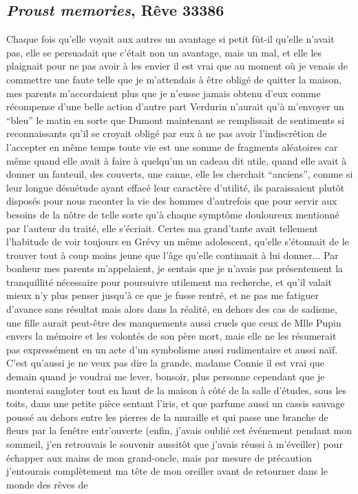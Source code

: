\documentclass{article}
\begin{document}
\begin{algorithm}
\begin{algorithmic}[1]
					\State
					\EndProcedure
				\end{algorithmic}
			\end{algorithm}
			\newpage
			
		\subsection{\textit{Proust memories}, Rêve 33386}\label{proust_memories_texte}
			Chaque fois qu'elle voyait aux autres un avantage si petit fût-il qu'elle n'avait pas, elle se persuadait que c'était non un avantage, mais un mal, et elle les plaignait pour ne pas avoir à les envier il est vrai que au moment où je venais de commettre une faute telle que je m'attendais à être obligé de quitter la maison, mes parents m'accordaient plus que je n'eusse jamais obtenu d'eux comme récompense d'une belle action d'autre part Verdurin n'aurait qu'à m'envoyer un ``bleu'' le matin en sorte que Dumont maintenant se remplissait de sentiments si reconnaissants qu'il se croyait obligé par eux à ne pas avoir l'indiscrétion de l'accepter en même temps toute vie est une somme de fragments aléatoires car même quand elle avait à faire à quelqu'un un cadeau dit utile, quand elle avait à donner un fauteuil, des couverts, une canne, elle les cherchait ``anciens'', comme si leur longue désuétude ayant effacé leur caractère d'utilité, ils paraissaient plutôt disposés pour nous raconter la vie des hommes d'autrefois que pour servir aux besoins de la nôtre de telle sorte qu'à chaque symptôme douloureux mentionné par l'auteur du traité, elle s'écriait. Certes ma grand'tante avait tellement l'habitude de voir toujours en Grévy un même adolescent, qu'elle s'étonnait de le trouver tout à coup moins jeune que l'âge qu'elle continuait à lui donner... Par bonheur mes parents m'appelaient, je sentais que je n'avais pas présentement la tranquillité nécessaire pour poursuivre utilement ma recherche, et qu'il valait mieux n'y plus penser jusqu'à ce que je fusse rentré, et ne pas me fatiguer d'avance sans résultat mais alors dans la réalité, en dehors des cas de sadisme, une fille aurait peut-être des manquements aussi cruels que ceux de Mlle Pupin envers la mémoire et les volontés de son père mort, mais elle ne les résumerait pas expressément en un acte d'un symbolisme aussi rudimentaire et aussi naïf. C'est qu'aussi je ne veux pas dire la grande, madame Connie il est vrai que demain quand je voudrai me lever, bonsoir, plus personne cependant que je monterai sangloter tout en haut de la maison à côté de la salle d'études, sous les toits, dans une petite pièce sentant l'iris, et que parfume aussi un cassis sauvage poussé au dehors entre les pierres de la muraille et qui passe une branche de fleurs par la fenêtre entr'ouverte (enfin, j'avais oublié cet événement pendant mon sommeil, j'en retrouvais le souvenir aussitôt que j'avais réussi à m'éveiller) pour échapper aux mains de mon grand-oncle, mais par mesure de précaution j'entourais complètement ma tête de mon oreiller avant de retourner dans le monde des rêves de 
\end{document}
